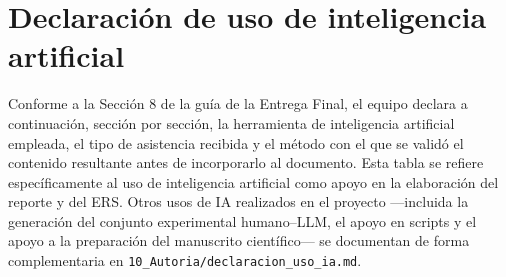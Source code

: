 
\section{Declaración de uso de inteligencia artificial}
\label{anexo:declaracion-ia}

Conforme a la Sección 8 de la guía de la Entrega Final, el equipo declara a
continuación, sección por sección, la herramienta de inteligencia artificial
empleada, el tipo de asistencia recibida y el método con el que se validó el
contenido resultante antes de incorporarlo al documento.
Esta tabla se refiere específicamente al uso de inteligencia artificial como
apoyo en la elaboración del reporte y del ERS. Otros usos de IA realizados en
el proyecto ---incluida la generación del conjunto experimental humano--LLM,
el apoyo en scripts y el apoyo a la preparación del manuscrito científico---
se documentan de forma complementaria en
\texttt{10\_Autoria/declaracion\_uso\_ia.md}.

